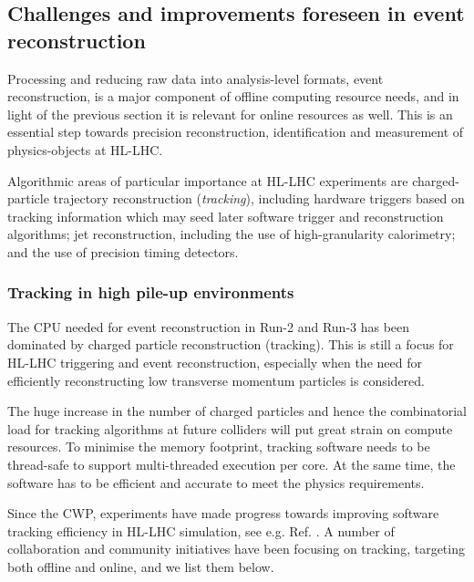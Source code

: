\hypertarget{challenges-and-improvements-foreseen-in-event-reconstruction}{%
\subsection{Challenges and improvements foreseen in event
reconstruction}\label{challenges-and-improvements-foreseen-in-event-reconstruction}}

Processing and reducing raw data into analysis-level formats, event
reconstruction, is a major component of offline computing resource
needs, and in light of the previous section it is relevant for online
resources as well. This is an essential step towards precision
reconstruction, identification and measurement of physics-objects at
HL-LHC.

Algorithmic areas of particular importance at HL-LHC experiments are
charged-particle trajectory reconstruction (\textit{tracking}), including
hardware triggers based on tracking information which may seed later
software trigger and reconstruction algorithms; jet reconstruction,
including the use of high-granularity calorimetry; and the use of
precision timing detectors.

\hypertarget{tracking-in-high-pile-up-environments}{%
\subsubsection{Tracking in high pile-up
environments}\label{tracking-in-high-pile-up-environments}}

The CPU needed for event reconstruction in Run-2 and Run-3 has been
dominated by charged particle reconstruction (tracking). This is still a
focus for HL-LHC triggering and event reconstruction, especially when
the need for efficiently reconstructing low transverse momentum
particles is considered.

The huge increase in the number of charged particles and hence the
combinatorial load for tracking algorithms at future colliders will put
great strain on compute resources. To minimise the memory footprint,
tracking software needs to be thread-safe to support multi-threaded
execution per core. At the same time, the software has to be efficient
and accurate to meet the physics requirements.

Since the CWP, experiments have made progress towards improving software
tracking efficiency in HL-LHC simulation, see e.g. Ref. \cite{ATL-PHYS-PUB-2019-041}. A
number of collaboration and community initiatives have been focusing on
tracking, targeting both offline and online, and we list them below.

